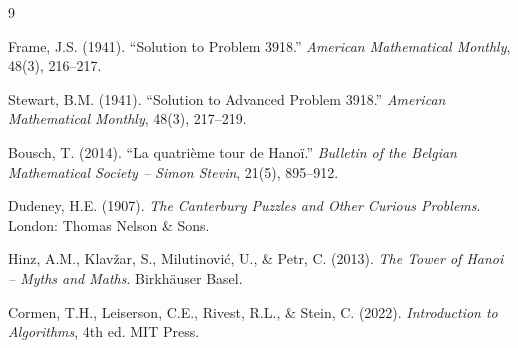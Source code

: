 \documentclass[12pt, a4paper]{article}
\begin{document}
\begin{thebibliography}{9}

Frame, J.S. (1941).
``Solution to Problem 3918.''
\textit{American Mathematical Monthly}, 48(3), 216--217.

Stewart, B.M. (1941).
``Solution to Advanced Problem 3918.''
\textit{American Mathematical Monthly}, 48(3), 217--219.

Bousch, T. (2014).
``La quatri\`eme tour de Hano\"i.''
\textit{Bulletin of the Belgian Mathematical Society -- Simon Stevin}, 21(5), 895--912.

Dudeney, H.E. (1907).
\textit{The Canterbury Puzzles and Other Curious Problems}.
London: Thomas Nelson \& Sons.

Hinz, A.M., Klav\v{z}ar, S., Milutinovi\'c, U., \& Petr, C. (2013).
\textit{The Tower of Hanoi -- Myths and Maths}.
Birkh\"auser Basel.

Cormen, T.H., Leiserson, C.E., Rivest, R.L., \& Stein, C. (2022).
\textit{Introduction to Algorithms}, 4th ed.
MIT Press.

\end{thebibliography}
\end{document}
